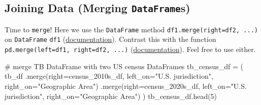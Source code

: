 \documentclass[
  letterpaper,
  DIV=11,
  numbers=noendperiod]{scrreprt}
\newenvironment{Shaded}{\begin{snugshade}}{\end{snugshade}}
\newcommand{\CommentTok}[1]{\textcolor[rgb]{0.37,0.37,0.37}{#1}}
\newcommand{\DecValTok}[1]{\textcolor[rgb]{0.68,0.00,0.00}{#1}}
\newcommand{\NormalTok}[1]{\textcolor[rgb]{0.00,0.23,0.31}{#1}}
\newcommand{\OperatorTok}[1]{\textcolor[rgb]{0.37,0.37,0.37}{#1}}
\newcommand{\StringTok}[1]{\textcolor[rgb]{0.13,0.47,0.30}{#1}}
\begin{document}
\subsection{\texorpdfstring{Joining Data (Merging
\texttt{DataFrame}s)}{Joining Data (Merging DataFrames)}}\label{joining-data-merging-dataframes}

Time to \texttt{merge}! Here we use the \texttt{DataFrame} method
\texttt{df1.merge(right=df2,\ ...)} on \texttt{DataFrame} \texttt{df1}
(\href{https://pandas.pydata.org/docs/reference/api/pandas.DataFrame.merge.html}{documentation}).
Contrast this with the function
\texttt{pd.merge(left=df1,\ right=df2,\ ...)}
(\href{https://pandas.pydata.org/docs/reference/api/pandas.merge.html?highlight=pandas\%20merge\#pandas.merge}{documentation}).
Feel free to use either.

\begin{Shaded}
\begin{Highlighting}[]
\CommentTok{\# merge TB DataFrame with two US census DataFrames}
\NormalTok{tb\_census\_df }\OperatorTok{=}\NormalTok{ (}
\NormalTok{    tb\_df}
\NormalTok{    .merge(right}\OperatorTok{=}\NormalTok{census\_2010s\_df,}
\NormalTok{           left\_on}\OperatorTok{=}\StringTok{"U.S. jurisdiction"}\NormalTok{, right\_on}\OperatorTok{=}\StringTok{"Geographic Area"}\NormalTok{)}
\NormalTok{    .merge(right}\OperatorTok{=}\NormalTok{census\_2020s\_df,}
\NormalTok{           left\_on}\OperatorTok{=}\StringTok{"U.S. jurisdiction"}\NormalTok{, right\_on}\OperatorTok{=}\StringTok{"Geographic Area"}\NormalTok{)}
\NormalTok{)}
\NormalTok{tb\_census\_df.head(}\DecValTok{5}\NormalTok{)}
\end{Highlighting}
\end{Shaded}
\end{document}
